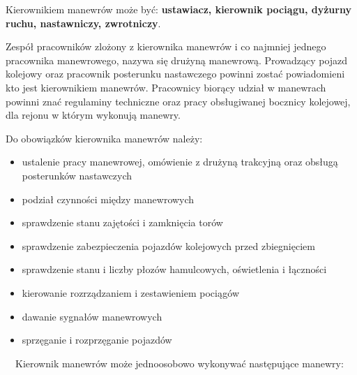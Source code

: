Kierownikiem manewrów może być: \textbf{ustawiacz, kierownik pociągu, dyżurny ruchu, nastawniczy, zwrotniczy}. 

Zespół pracowników zlożony z kierownika manewrów i co najmniej jednego pracownika manewrowego,  nazywa się drużyną
manewrową. Prowadzący pojazd kolejowy oraz pracownik posterunku nastawczego powinni zostać powiadomieni kto jest
kierownikiem manewrów. Pracownicy biorący udział w manewrach powinni znać regulaminy techniczne oraz pracy obsługiwanej
bocznicy kolejowej, dla rejonu w którym wykonują manewry.

Do obowiązków kierownika manewrów należy:

\begin{itemize}
\item ustalenie pracy manewrowej, omówienie z drużyną trakcyjną oraz obsługą posterunków nastawczych
\item podział czynności między manewrowych
\item sprawdzenie stanu zajętości i zamknięcia torów
\item sprawdzenie zabezpieczenia pojazdów kolejowych przed zbiegnięciem
\item sprawdzenie stanu i liczby płozów hamulcowych, oświetlenia i łączności
\item kierowanie rozrządzaniem i zestawieniem pociągów
\item dawanie sygnałów manewrowych
\item sprzęganie i rozprzęganie pojazdów
\end{itemize}
\ \ Kierownik manewrów może jednoosobowo wykonywać następujące manewry:

